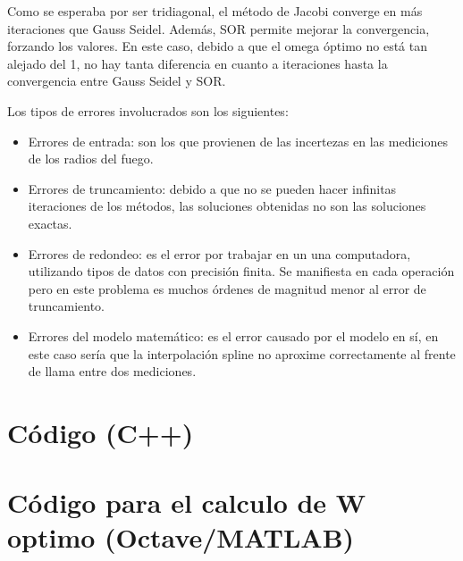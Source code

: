 \documentclass[12pt,spanish]{article}
\begin{document}
Como se esperaba por ser tridiagonal, el método de Jacobi converge en más iteraciones que Gauss Seidel. Además, SOR permite mejorar la convergencia, forzando los valores. En este caso, debido a que el omega óptimo no está tan alejado del 1, no hay tanta diferencia en cuanto a iteraciones hasta la convergencia entre Gauss Seidel y SOR. 

Los tipos de errores involucrados son los siguientes:
\begin{itemize}
    \item Errores de entrada: son los que provienen de las incertezas en las mediciones de los radios del fuego.
    \item Errores de truncamiento: debido a que no se pueden hacer infinitas iteraciones de los métodos, las soluciones obtenidas no son las soluciones exactas.
    \item Errores de redondeo: es el error por trabajar en un una computadora, utilizando tipos de datos con precisión finita. Se manifiesta en cada operación pero en este problema es muchos órdenes de magnitud menor al error de truncamiento.
    \item Errores del modelo matemático: es el error causado por el modelo en sí, en este caso sería que la interpolación spline no aproxime correctamente al frente de llama entre dos mediciones.
\end{itemize}

\newpage
\appendix
\section{Código (C++)}

\section{Código para el calculo de W optimo (Octave/MATLAB)}

\end{document}
